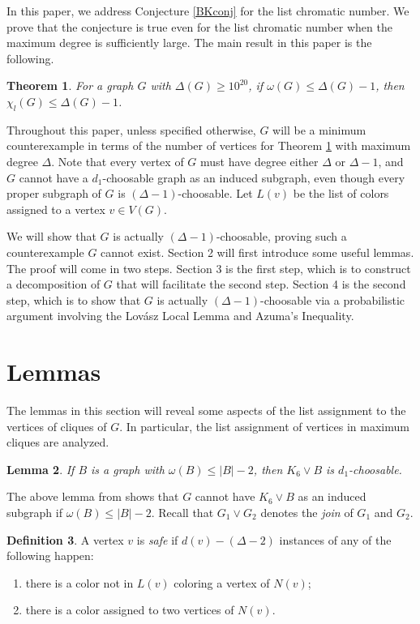 \documentclass[12pt]{article}
\newtheorem{theorem}{Theorem}[section]
\newtheorem{lemma}[theorem]{Lemma}
\theoremstyle{definition}
\newtheorem{definition}[theorem]{Definition}
\begin{document}
In this paper, we address Conjecture \ref{BKconj} for the list chromatic number. 
We prove that the conjecture is true even for the list chromatic number when the maximum degree is sufficiently large. 
The main result in this paper is the following. 

\begin{theorem}\label{result}
For a graph $G$ with $\Delta(G)\geq 10^{20}$, 
if $\omega(G)\leq \Delta(G)-1$, then $\chi_l(G)\leq \Delta(G)-1$. 
\end{theorem}

Throughout this paper, unless specified otherwise, $G$ will be a minimum counterexample in terms of the number of vertices for Theorem \ref{result} with maximum degree $\Delta$. 
Note that every vertex of $G$ must have degree either $\Delta$ or $\Delta-1$, and $G$ cannot have a $d_1$-choosable graph as an induced subgraph, even though every proper subgraph of $G$ is $(\Delta-1)$-choosable.
Let $L(v)$ be the list of colors assigned to a vertex $v\in V(G)$. 

We will show that $G$ is actually $(\Delta-1)$-choosable, proving such a counterexample $G$ cannot exist.
Section 2 will first introduce some useful lemmas.
The proof will come in two steps. 
Section 3 is the first step, which is to construct a decomposition of $G$ that will facilitate the second step.
Section 4 is the second step, which is to show that $G$ is actually $(\Delta-1)$-choosable via a probabilistic argument involving the Lov\'asz Local Lemma and Azuma's Inequality.

\section{Lemmas}

The lemmas in this section will reveal some aspects of the list assignment to the vertices of cliques of $G$. In particular, the list assignment of vertices in maximum cliques are analyzed.

\begin{lemma}\cite{CR12}\label{K6Possibilities}
If $B$ is a graph with $\omega(B) \leq |B| - 2$, then $K_6\vee B$ is $d_1$-choosable.
\end{lemma}

The above lemma from \cite{CR12} shows that $G$ cannot have $K_6\vee B$ as an induced subgraph if $\omega(B) \leq |B| - 2$. Recall that $G_1\vee G_2$ denotes the {\it join} of $G_1$ and $G_2$.

\begin{definition}
A vertex $v$ is {\it safe} if $d(v)-(\Delta-2)$ instances of any of the following happen:
\begin{enumerate}
\item there is a color not in $L(v)$ coloring a vertex of $N(v)$; 
\item there is a color assigned to two vertices of $N(v)$.
\end{enumerate}
\end{definition}
\end{document}
